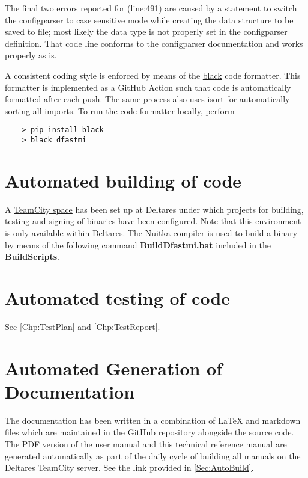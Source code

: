The final two errors reported for  (line:491) are caused by a statement to switch the configparser to case sensitive mode while creating the data structure to be saved to file; most likely the data type is not properly set in the configparser definition.
That code line conforms to the configparser documentation and works properly as is.

A consistent coding style is enforced by means of the \href{https://pypi.org/project/black/}{black} code formatter.
This formatter is implemented as a GitHub Action such that code is automatically formatted after each push.
The same process also uses \href{https://pypi.org/project/isort/}{isort} for automatically sorting all imports.
To run the code formatter locally, perform 

\begin{Verbatim}
    > pip install black
    > black dfastmi
\end{Verbatim}

\section{Automated building of code} \label{Sec:AutoBuild}

A \href{https://dpcbuild.deltares.nl/project/DFast_DFastMorphologicalImpact}{TeamCity space} has been set up at Deltares under which projects for building, testing and signing of binaries have been configured.
Note that this environment is only available within Deltares.
The Nuitka compiler is used to build a binary by means of the following command \textbf{BuildDfastmi.bat} included in the \textbf{BuildScripts}.

\section{Automated testing of code}

See \autoref{Chp:TestPlan} and \autoref{Chp:TestReport}.

\section{Automated Generation of Documentation}

The documentation has been written in a combination of LaTeX and markdown files which are maintained in the GitHub repository alongside the source code.
The PDF version of the user manual and this technical reference manual are generated automatically as part of the daily cycle of building all manuals on the Deltares TeamCity server.
See the link provided in \autoref{Sec:AutoBuild}.